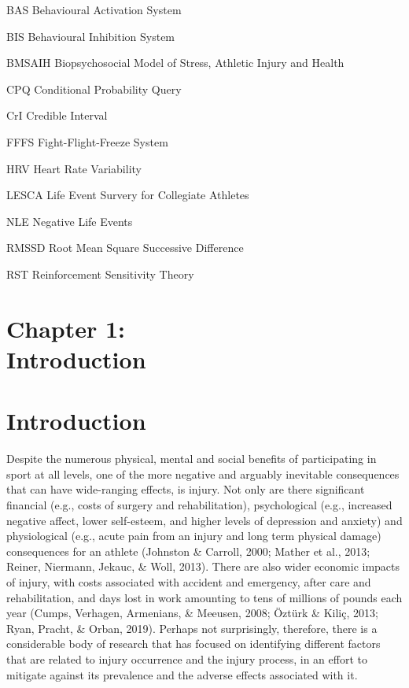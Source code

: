 \documentclass[man,floatsintext]{apa6}
\begin{document}
\begin{abbrv}
 
\item[BAS] Behavioural Activation System
\item[BIS] Behavioural Inhibition System
\item[BMSAIH] Biopsychosocial Model of Stress, Athletic Injury and Health
\item[CPQ] Conditional Probability Query
\item[CrI] Credible Interval
\item[FFFS] Fight-Flight-Freeze System
\item[HRV] Heart Rate Variability
\item[LESCA] Life Event Survery for Collegiate Athletes
\item[NLE] Negative Life Events
\item[RMSSD] Root Mean Square Successive Difference
\item[RST] Reinforcement Sensitivity Theory 
 
\end{abbrv}

\clearpage

\setcounter{page}{1}

\vspace*{3cm}

\section[Chapter 1: Introduction]{\Large{Chapter 1: \\ Introduction}}

\clearpage

\hypertarget{introduction}{%
\section{Introduction}\label{introduction}}

Despite the numerous physical, mental and social benefits of participating in sport at all levels, one of the more negative and arguably inevitable consequences that can have wide-ranging effects, is injury.
Not only are there significant financial (e.g., costs of surgery and rehabilitation), psychological (e.g., increased negative affect, lower self-esteem, and higher levels of depression and anxiety) and physiological (e.g., acute pain from an injury and long term physical damage) consequences for an athlete (Johnston \& Carroll, 2000; Mather et al., 2013; Reiner, Niermann, Jekauc, \& Woll, 2013).
There are also wider economic impacts of injury, with costs associated with accident and emergency, after care and rehabilitation, and days lost in work amounting to tens of millions of pounds each year (Cumps, Verhagen, Armenians, \& Meeusen, 2008; Öztürk \& Kiliç, 2013; Ryan, Pracht, \& Orban, 2019).
Perhaps not surprisingly, therefore, there is a considerable body of research that has focused on identifying different factors that are related to injury occurrence and the injury process, in an effort to mitigate against its prevalence and the adverse effects associated with it.
\end{document}

